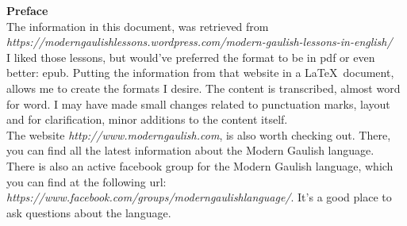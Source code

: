 \begin{center}
\textbf{Preface}\\
\bigskip
\noindent The information in this document, was retrieved from \textit{https://moderngaulishlessons.wordpress.com/modern-gaulish-lessons-in-english/}\\
\bigskip
\noindent I liked those lessons, but would've preferred the format to be in pdf or even better: epub. Putting the information from that website in a \LaTeX\ document, allows me to create the formats I desire. The content is transcribed, almost word for word. I may have made small changes related to punctuation marks, layout and for clarification, minor additions to the content itself.\\
\bigskip
\noindent The website \textit{http://www.moderngaulish.com}, is also worth checking out. There, you can find all the latest information about the Modern Gaulish language.\\
\bigskip
\noindent There is also an active facebook group for the Modern Gaulish language, which you can find at the following url: \textit{https://www.facebook.com/groups/moderngaulishlanguage/}. It's a good place to ask questions about the language.
\end{center}
